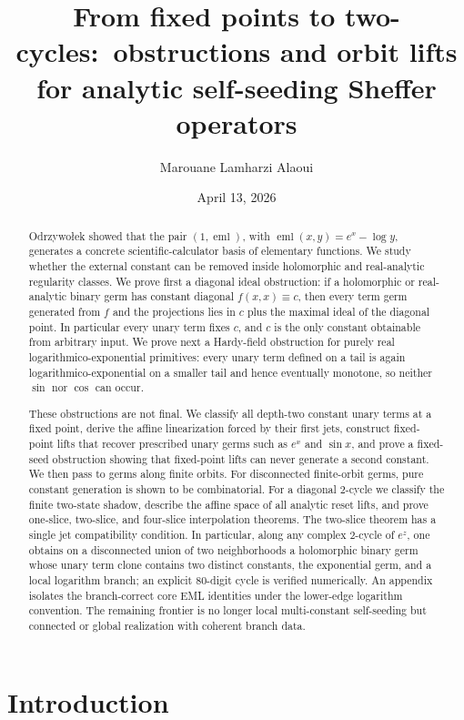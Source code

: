 \documentclass[11pt]{amsart}
\title[From fixed points to two-cycles]{From fixed points to two-cycles:\ obstructions and orbit lifts for analytic self-seeding Sheffer operators}
\author{Marouane Lamharzi Alaoui}
\date{April 13, 2026}
\numberwithin{equation}{section}
\theoremstyle{remark}
\theoremstyle{definition}
\newcommand{\eml}{\operatorname{eml}}
\begin{document}
\begin{abstract}
Odrzywo{\l}ek showed that the pair $(1,\eml)$, with $\eml(x,y)=e^x-\log y$, generates a concrete scientific-calculator basis of elementary functions. We study whether the external constant can be removed inside holomorphic and real-analytic regularity classes. We prove first a diagonal ideal obstruction: if a holomorphic or real-analytic binary germ has constant diagonal $f(x,x)\equiv c$, then every term germ generated from $f$ and the projections lies in $c$ plus the maximal ideal of the diagonal point. In particular every unary term fixes $c$, and $c$ is the only constant obtainable from arbitrary input. We prove next a Hardy-field obstruction for purely real logarithmico-exponential primitives: every unary term defined on a tail is again logarithmico-exponential on a smaller tail and hence eventually monotone, so neither $\sin$ nor $\cos$ can occur.

These obstructions are not final. We classify all depth-two constant unary terms at a fixed point, derive the affine linearization forced by their first jets, construct fixed-point lifts that recover prescribed unary germs such as $e^x$ and $\sin x$, and prove a fixed-seed obstruction showing that fixed-point lifts can never generate a second constant. We then pass to germs along finite orbits. For disconnected finite-orbit germs, pure constant generation is shown to be combinatorial. For a diagonal $2$-cycle we classify the finite two-state shadow, describe the affine space of all analytic reset lifts, and prove one-slice, two-slice, and four-slice interpolation theorems. The two-slice theorem has a single jet compatibility condition. In particular, along any complex $2$-cycle of $e^z$, one obtains on a disconnected union of two neighborhoods a holomorphic binary germ whose unary term clone contains two distinct constants, the exponential germ, and a local logarithm branch; an explicit $80$-digit cycle is verified numerically. An appendix isolates the branch-correct core EML identities under the lower-edge logarithm convention. The remaining frontier is no longer local multi-constant self-seeding but connected or global realization with coherent branch data.
\end{abstract}

\maketitle

\section{Introduction}
\end{document}
